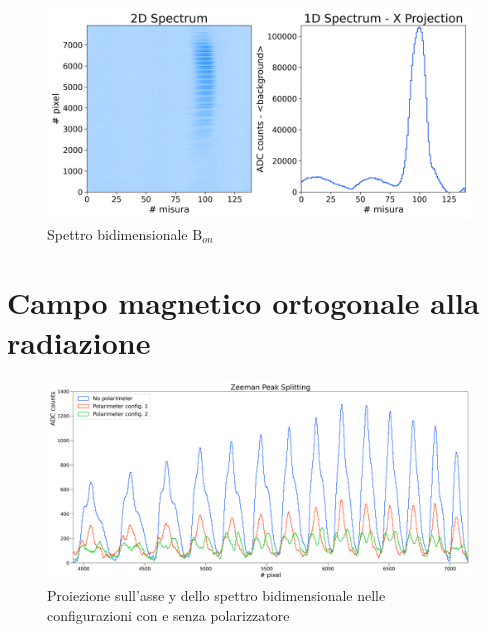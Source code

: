 \documentclass[twocolumn,10pt]{asme2ej}
\begin{document}
\begin{figure}[h]
    \centering
    \includegraphics[width=\linewidth]{../Plots/Bon_2d_spectrum.png}
    \caption{Spettro bidimensionale $\text{B}_{on}$}
    \label{i:spettro2d_Bon}
\end{figure}




\section{Campo magnetico ortogonale alla radiazione}

\begin{figure}
    \centering
    \includegraphics[width=\textwidth]{../Plots/Bon_overlap_big.png}
    \caption{Proiezione sull'asse y dello spettro bidimensionale nelle configurazioni con e senza polarizzatore}
    \label{i:spettro2d_overlap}
\end{figure}
\end{document}
